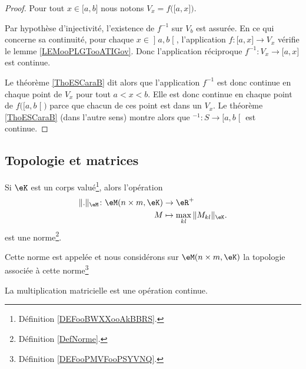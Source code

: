 \begin{proof}
	Pour tout \( x\in \mathopen[ a , b \mathclose]\) nous notons \( V_x=f\big( \mathopen[ a , x \mathclose] \big)\).

	Par hypothèse d'injectivité, l'existence de \( f^{-1}\) sur \( V_b\) est assurée. En ce qui concerne sa continuité, pour chaque \( x\in\mathopen] a , b \mathclose[\), l'application \( f\colon \mathopen[ a , x \mathclose]\to V_x\) vérifie le lemme \ref{LEMooPLGTooATIGov}. Donc l'application réciproque \( f^{-1}\colon V_x\to \mathopen[ a , x \mathclose]\) est continue.

	Le théorème \ref{ThoESCaraB} dit alors que l'application \( f^{-1}\) est donc continue en chaque point de \( V_x \) pour tout \( a<x<b\). Elle est donc continue en chaque point de \( f\big( \mathopen[ a , b \mathclose[ \big)\) parce que chacun de ces point est dans un \( V_x\). Le théorème \ref{ThoESCaraB}  (dans l'autre sens) montre alors que \( ^{-1}\colon S\to \mathopen[ a , b \mathclose[\) est continue.
\end{proof}


\subsection{Topologie et matrices}

\begin{lemmaDef}      \label{DEFooCQHDooYpUAhG}
	Si \( \eK\) est un corps valué\footnote{Définition \ref{DEFooBWXXooAkBBRS}.}, alors l'opération
	\begin{equation}
		\begin{aligned}
			\| . \|_{\eM}\colon \eM(n\times m,\eK) & \to \eR^+                             \\
			M                                      & \mapsto  \max_{kl}\| M_{kl} \|_{\eK}.
		\end{aligned}
	\end{equation}
	est une norme\footnote{Définition \ref{DefNorme}.}.

	Cette norme est appelée  et nous considérons sur \( \eM(n\times m, \eK)\) la topologie associée à cette norme\footnote{Définition \ref{DEFooPMVFooPSYVNQ}.}
\end{lemmaDef}

\begin{proposition}     \label{PROPooOEETooPhqWuf}
	La multiplication matricielle est une opération continue.
\end{proposition}

